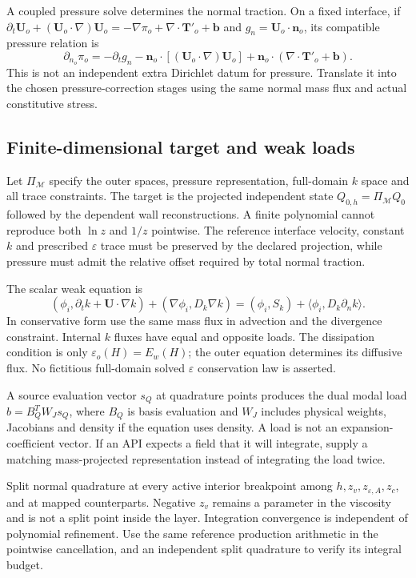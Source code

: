 \documentclass[11pt,a4paper]{article}
\numberwithin{equation}{section}
\newcommand{\eps}{\varepsilon}
\begin{document}
A coupled pressure solve determines the normal traction. On a fixed
interface, if
$\partial_t\bm U_o+(\bm U_o\cdot\nabla)\bm U_o
=-\nabla\pi_o+\nabla\cdot\bm T'_o+\bm b$
and $g_n=\bm U_o\cdot\bm n_o$, its compatible pressure relation is
\begin{equation}
 \partial_{n_o}\pi_o=-\partial_tg_n
 -\bm n_o\cdot[(\bm U_o\cdot\nabla)\bm U_o]
 +\bm n_o\cdot(\nabla\cdot\bm T'_o+\bm b).
 \label{eq:pressure-stage}
\end{equation}
This is not an independent extra Dirichlet datum for pressure.
Translate it into the chosen pressure-correction stages using the same
normal mass flux and actual constitutive stress.

\subsection{Finite-dimensional target and weak loads}
Let $\Pi_{\mathcal M}$ specify the outer spaces, pressure representation,
full-domain $k$ space and all trace constraints. The target is the
projected independent state $Q_{0,h}=\Pi_{\mathcal M}Q_0$ followed by
the dependent wall reconstructions. A finite polynomial cannot reproduce
both $\ln z$ and $1/z$ pointwise. The reference interface velocity,
constant $k$ and prescribed $\eps$ trace must be preserved by the
declared projection, while pressure must admit the relative offset
required by total normal traction.

The scalar weak equation is
\begin{equation}
 (\phi_i,\partial_tk+\bm U\cdot\nabla k)
 +(\nabla\phi_i,D_k\nabla k)
 =(\phi_i,S_k)+\langle\phi_i,D_k\partial_nk\rangle.
 \label{eq:hp-scalar-weak}
\end{equation}
In conservative form use the same mass flux in advection and the
divergence constraint. Internal $k$ fluxes have equal and opposite
loads. The dissipation condition is only
$\eps_o(H)=E_w(H)$; the outer equation determines its diffusive flux.
No fictitious full-domain solved $\eps$ conservation law is asserted.

A source evaluation vector $s_Q$ at quadrature points produces the
dual modal load $b=B_Q^TW_Js_Q$, where $B_Q$ is basis evaluation and
$W_J$ includes physical weights, Jacobians and density if the equation
uses density. A load is not an expansion-coefficient vector. If an API
expects a field that it will integrate, supply a matching mass-projected
representation instead of integrating the load twice.

Split normal quadrature at every active interior breakpoint among
$h,z_v,z_{\eps,A},z_c$, and at mapped counterparts. Negative $z_v$
remains a parameter in the viscosity and is not a split point inside
the layer. Integration convergence is independent of polynomial
refinement. Use the same reference production arithmetic in the
pointwise cancellation, and an independent split quadrature to verify
its integral budget.
\end{document}
